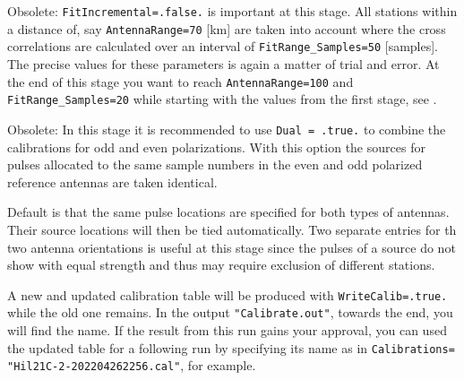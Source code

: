 Obsolete: \verb!FitIncremental=.false.! is important at this stage. All stations within a distance of, say \verb!AntennaRange=70! [km] are taken into account where the cross correlations are calculated over an interval of \verb!FitRange_Samples=50! [samples]. The precise values for these parameters is again a matter of trial and error. At the end of this stage you want to reach \verb!AntennaRange=100! and \verb!FitRange_Samples=20! while starting with the values from the first stage, see .

Obsolete: In this stage it is recommended to use \verb!Dual = .true.! to combine the calibrations for odd and even polarizations. With this option the sources for pulses allocated to the same sample numbers in the even and odd polarized reference antennas are taken identical.

Default is that the same pulse locations are specified for both types of antennas. Their source locations will then be tied automatically. Two separate entries for th two antenna orientations is useful at this stage since the pulses of a source do not show with equal strength and thus may require exclusion of different stations.

A new and updated calibration table will be produced with \verb!WriteCalib=.true.! while the old one remains. In the output \verb!"Calibrate.out"!, towards the end, you will find the name. If the result from this run gains your approval, you can used the updated table for a following run by specifying its name as in \verb!Calibrations= "Hil21C-2-202204262256.cal"!, for example.


